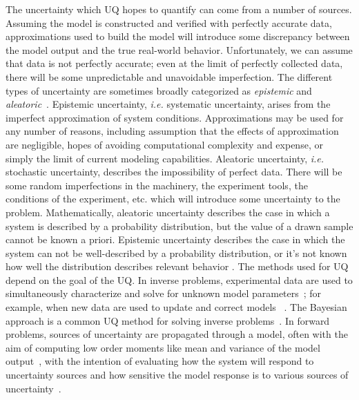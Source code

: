 The uncertainty which UQ hopes to quantify can come from a number of sources. Assuming the model is constructed and verified with perfectly accurate data, approximations used to build the model will introduce some discrepancy between the model output and the true real-world behavior. Unfortunately, we can assume that data is not perfectly accurate; even at the limit of perfectly collected data, there will be some unpredictable and unavoidable imperfection. The different types of uncertainty are sometimes broadly categorized as \textit{epistemic} and \textit{aleatoric}~\cite{matthies}. Epistemic uncertainty, \textit{i.e.} systematic uncertainty, arises from the imperfect approximation of system conditions. Approximations may be used for any number of reasons, including assumption that the effects of approximation are negligible, hopes of avoiding computational complexity and expense, or simply the limit of current modeling capabilities. Aleatoric uncertainty, \textit{i.e.} stochastic uncertainty, describes the impossibility of perfect data. There will be some random imperfections in the machinery, the experiment tools, the conditions of the experiment, etc. which will introduce some uncertainty to the problem. Mathematically, aleatoric uncertainty describes the case in which a system is described by a probability distribution, but the value of a drawn sample cannot be known a priori. Epistemic uncertainty describes the case in which the system can not be well-described by a probability distribution, or it's not known how well the distribution describes relevant behavior \cite{smithUQ}. 
The methods used for UQ depend on the goal of the UQ. In inverse problems, experimental data are used to simultaneously characterize and solve for unknown model parameters~\cite{wildey-presentation}; for example, when new data are used to update and correct models ~\cite{ghanem-uq-handbook, inverse}.
The Bayesian approach is a common UQ method for solving inverse problems~\cite{wildey-presentation, ghanem-uq-handbook}. In forward problems, sources of uncertainty are propagated through a model, often with the aim of computing low order moments like mean and variance of the model output~\cite{ghanem-uq-handbook}, with the intention of evaluating how the system will respond to uncertainty sources and how sensitive the model response is to various sources of uncertainty~\cite{saltelliGSA}.

